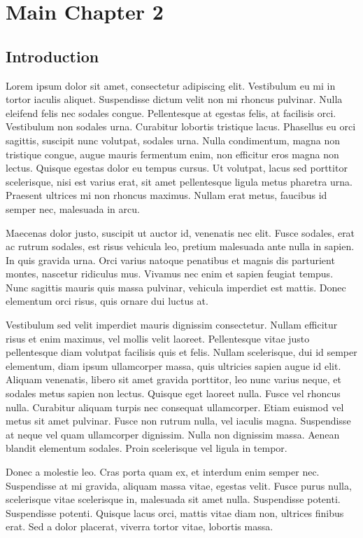 \chapter{Main Chapter 2}
\label{chap:Main_2}
\section{Introduction}
\label{sec:Main_2_Intro}
Lorem ipsum dolor sit amet, consectetur adipiscing elit. Vestibulum eu mi in tortor iaculis aliquet. Suspendisse dictum velit non mi rhoncus pulvinar. Nulla eleifend felis nec sodales congue. Pellentesque at egestas felis, at facilisis orci. Vestibulum non sodales urna. Curabitur lobortis tristique lacus. Phasellus eu orci sagittis, suscipit nunc volutpat, sodales urna. Nulla condimentum, magna non tristique congue, augue mauris fermentum enim, non efficitur eros magna non lectus. Quisque egestas dolor eu tempus cursus. Ut volutpat, lacus sed porttitor scelerisque, nisi est varius erat, sit amet pellentesque ligula metus pharetra urna. Praesent ultrices mi non rhoncus maximus. Nullam erat metus, faucibus id semper nec, malesuada in arcu.

Maecenas dolor justo, suscipit ut auctor id, venenatis nec elit. Fusce sodales, erat ac rutrum sodales, est risus vehicula leo, pretium malesuada ante nulla in sapien. In quis gravida urna. Orci varius natoque penatibus et magnis dis parturient montes, nascetur ridiculus mus. Vivamus nec enim et sapien feugiat tempus. Nunc sagittis mauris quis massa pulvinar, vehicula imperdiet est mattis. Donec elementum orci risus, quis ornare dui luctus at.

Vestibulum sed velit imperdiet mauris dignissim consectetur. Nullam efficitur risus et enim maximus, vel mollis velit laoreet. Pellentesque vitae justo pellentesque diam volutpat facilisis quis et felis. Nullam scelerisque, dui id semper elementum, diam ipsum ullamcorper massa, quis ultricies sapien augue id elit. Aliquam venenatis, libero sit amet gravida porttitor, leo nunc varius neque, et sodales metus sapien non lectus. Quisque eget laoreet nulla. Fusce vel rhoncus nulla. Curabitur aliquam turpis nec consequat ullamcorper. Etiam euismod vel metus sit amet pulvinar. Fusce non rutrum nulla, vel iaculis magna. Suspendisse at neque vel quam ullamcorper dignissim. Nulla non dignissim massa. Aenean blandit elementum sodales. Proin scelerisque vel ligula in tempor.

Donec a molestie leo. Cras porta quam ex, et interdum enim semper nec. Suspendisse at mi gravida, aliquam massa vitae, egestas velit. Fusce purus nulla, scelerisque vitae scelerisque in, malesuada sit amet nulla. Suspendisse potenti. Suspendisse potenti. Quisque lacus orci, mattis vitae diam non, ultrices finibus erat. Sed a dolor placerat, viverra tortor vitae, lobortis massa.

